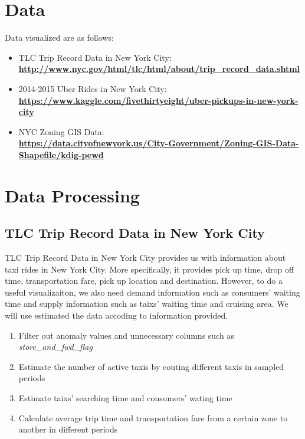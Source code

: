 \documentclass{article}
\newcommand {\weblink}[1]{\href{#1}{\textbf{#1}}}
\begin{document}
        \section{Data}
            Data visualized are as follows: 
            \begin{itemize}
                \item TLC Trip Record Data in New York City: \\
                    \weblink{http://www.nyc.gov/html/tlc/html/about/trip\_record\_data.shtml}
                \item 2014-2015 Uber Rides in New York City: \\ 
                    \weblink{https://www.kaggle.com/fivethirtyeight/uber-pickups-in-new-york-city}
                \item NYC Zoning GIS Data: \\ 
                    \weblink{https://data.cityofnewyork.us/City-Government/Zoning-GIS-Data-Shapefile/kdig-pewd}
            \end{itemize}
        \section{Data Processing}
            \subsection{TLC Trip Record Data in New York City}
            TLC Trip Record Data in New York City provides us with information about taxi rides in New York City. More specifically, it provides pick up time, 
            drop off time, transportation fare, pick up location and destination. However, to do a useful visualizaiton, we also need demand information such as
            consumers' waiting time and supply information such as taixs' waiting time and cruising area. We will use estimated the data accoding to information provided.

                \begin{enumerate}
                    \item Filter out anomaly values and unnecessary columns such as \textit{store\_and\_fwd\_flag}
                    \item Estimate the number of active taxis by couting different taxis in sampled periods
                    \item Estimate taixs' searching time and consumers' wating time
                    \item Calculate average trip time and transportation fare from a certain zone to another in different periods
                \end{enumerate}
\end{document}
